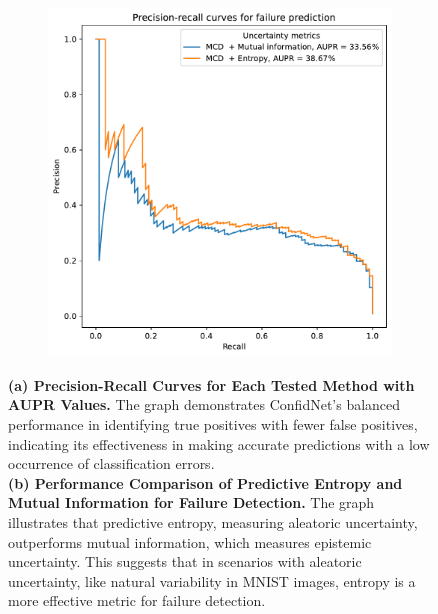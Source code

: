 \begin{figure}[H]
\begin{subfigure}{0.45\textwidth}
        \includegraphics[width=\textwidth]{failure_aupr_entropy_vs_mut_inf.pdf}
        \caption{}
        \label{fig:failure_aupr_entropy_vs_mut_inf}
    \end{subfigure}%
    \caption{\textbf{(a) Precision-Recall Curves for Each Tested Method with AUPR Values.} The graph demonstrates ConfidNet's balanced performance in identifying true positives with fewer false positives, indicating its effectiveness in making accurate predictions with a low occurrence of classification errors.\\\textbf{(b) Performance Comparison of Predictive Entropy and Mutual Information for Failure Detection.} The graph illustrates that predictive entropy, measuring aleatoric uncertainty, outperforms mutual information, which measures epistemic uncertainty. This suggests that in scenarios with aleatoric uncertainty, like natural variability in MNIST images, entropy is a more effective metric for failure detection.}
\end{figure}

